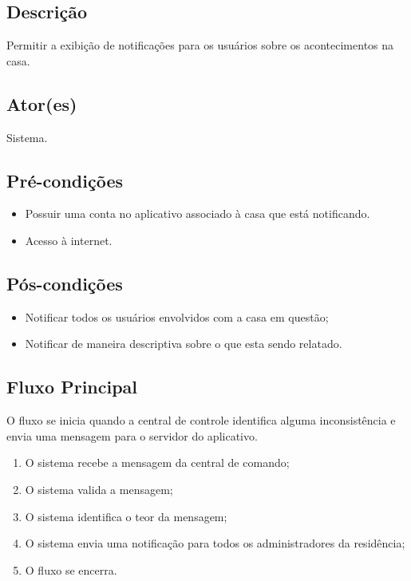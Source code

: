 \begin{anexosenv}
    \subsection{Descrição}
        Permitir a exibição de notificações para os usuários sobre os acontecimentos na casa.
    \subsection{Ator(es)}
        Sistema.
    \subsection{Pré-condições}
        \begin{itemize}
            \item Possuir uma conta no aplicativo associado à casa que está notificando.
            \item Acesso à internet.
        \end{itemize}
    \subsection{Pós-condições}
        \begin{itemize}
            \item Notificar todos os usuários envolvidos com a casa em questão;
            \item Notificar de maneira descriptiva sobre o que esta sendo relatado.
        \end{itemize}
    \subsection{Fluxo Principal}
        O fluxo se inicia quando a central de controle identifica alguma inconsistência e envia uma mensagem para o servidor do aplicativo.
        \begin{enumerate}
            \item O sistema recebe a mensagem da central de comando;
            \item O sistema valida a mensagem;
            \item O sistema identifica o teor da mensagem;
            \item O sistema envia uma notificação para todos os administradores da residência;
            \item O fluxo se encerra.
        \end{enumerate}
\end{anexosenv}
